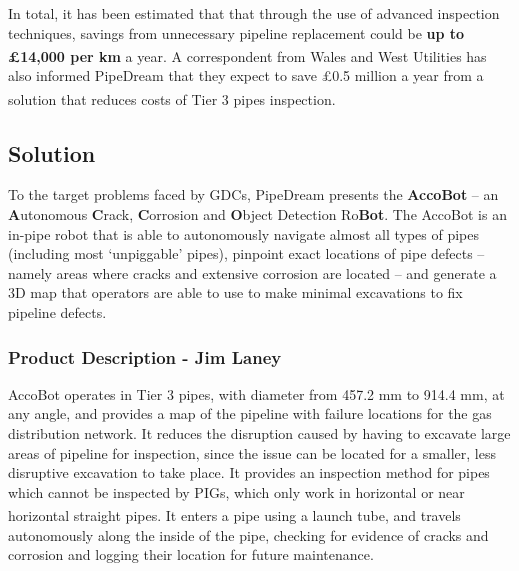 \documentclass[11pt]{article}		%
\newcommand{\supercite}[1]{\textsuperscript{\cite{#1}}}		%
\newcommand{\sectref}[1]{\hyperref[#1]{Section \ref*{#1}}}     %
\begin{document}
    In total, it has been estimated that that through the use of advanced inspection techniques, savings from unnecessary pipeline replacement could be \textbf{up to £14,000 per km} a year\supercite{GRAID}. A correspondent from Wales and West Utilities has also informed PipeDream that they expect to save £0.5 million a year from a solution that reduces costs of Tier 3 pipes inspection\supercite{WWU}. 

	\subsection[Solution]{Solution}
    To the target problems faced by GDCs, PipeDream presents the \textbf{AccoBot} – an \textbf{A}utonomous \textbf{C}rack, \textbf{C}orrosion and \textbf{O}bject Detection Ro\textbf{Bot}. 
    The AccoBot is an in-pipe robot that is able to autonomously navigate almost all types of pipes (including most ‘unpiggable’ pipes), pinpoint exact locations of pipe defects – namely areas where cracks and extensive corrosion are located – and generate a 3D map that operators are able to use to make minimal excavations to fix pipeline defects. 
	
	
	\subsubsection[Product Description]{Product Description - Jim Laney}
	        
			AccoBot operates in Tier 3 pipes, with diameter from 457.2 mm to 914.4 mm, at any angle, and provides a map of the pipeline with failure locations for the gas distribution network.
			It reduces the disruption caused by having to excavate large areas of pipeline for inspection, since the issue can be located for a smaller, less disruptive excavation to take place.
			It provides an inspection method for pipes which cannot be inspected by PIGs, which only work in horizontal or near horizontal straight pipes\supercite{mills2017advances}.
			It enters a pipe using a launch tube, and travels autonomously along the inside of the pipe, checking for evidence of cracks and corrosion and logging their location for future maintenance.
			
\end{document}
